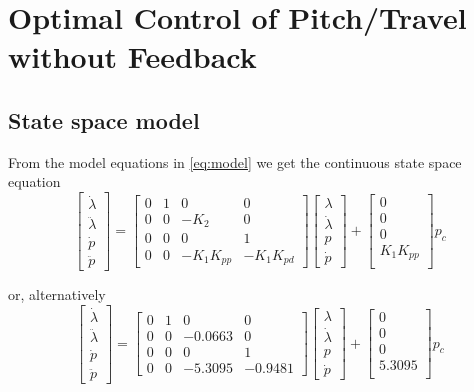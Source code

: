 \section{Optimal Control of Pitch/Travel without Feedback}\label{sec:prob2}

\subsection{State space model}
From the model equations in \eqref{eq:model} we get the continuous state space equation
\begin{equation*}
	\begin{bmatrix}
		\dot{\lambda}\\
		\ddot{\lambda}\\
		\dot{p}\\
		\ddot{p}
	\end{bmatrix} = 
	\begin{bmatrix}
		0 & 1 & 0 & 0 \\
		0 & 0 & -K_2 & 0 \\
		0 & 0 & 0 & 1 \\
		0 & 0 & -K_1K_{pp} & -K_1K_{pd}
	\end{bmatrix}
	\begin{bmatrix}
		\lambda	\\
		\dot{\lambda}		\\
		p		\\
		\dot{p}
	\end{bmatrix} +
	\begin{bmatrix}
		0 \\
		0 \\
		0 \\
		K_1K_{pp} \\
	\end{bmatrix}
	p_c
\end{equation*}

or, alternatively
\begin{equation*}
	\begin{bmatrix}
		\dot{\lambda}\\
		\ddot{\lambda}\\
		\dot{p}\\
		\ddot{p}
	\end{bmatrix} = 
	\begin{bmatrix}
		0 & 1 & 0 & 0 \\
		0 & 0 & -0.0663 & 0 \\
		0 & 0 & 0 & 1 \\
		0 & 0 & -5.3095 & -0.9481
	\end{bmatrix}
	\begin{bmatrix}
		\lambda	\\
		\dot{\lambda}		\\
		p		\\
		\dot{p}
	\end{bmatrix} +
	\begin{bmatrix}
		0 \\
		0 \\
		0 \\
		5.3095 \\
	\end{bmatrix}
	p_c
\end{equation*}

